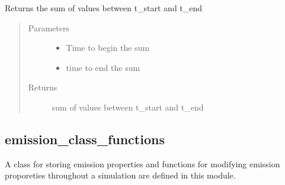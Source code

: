 \documentclass[letterpaper,10pt,english]{sphinxmanual}
\begin{document}
\begin{fulllineitems}
\begin{fulllineitems}
\end{fulllineitems}


\begin{fulllineitems}
\label{\detokenize{index:feast.EmissionSimModules.result_classes.ResultDiscrete.get_sum_val}}
Returns the sum of values between t\_start and t\_end
\begin{quote}\begin{description}
\item[{Parameters}] \leavevmode\begin{itemize}
\item {} 
 \textendash{} Time to begin the sum

\item {} 
 \textendash{} time to end the sum

\end{itemize}

\item[{Returns}] \leavevmode
sum of values between t\_start and t\_end

\end{description}\end{quote}

\end{fulllineitems}


\end{fulllineitems}



\subsection{emission\_class\_functions}
\label{\detokenize{index:module-feast.EmissionSimModules.emission_class_functions}}\label{\detokenize{index:emission-class-functions}}
A class for storing emission properties and functions for modifying emission proporeties throughout a simulation are
defined in this module.
\end{document}

